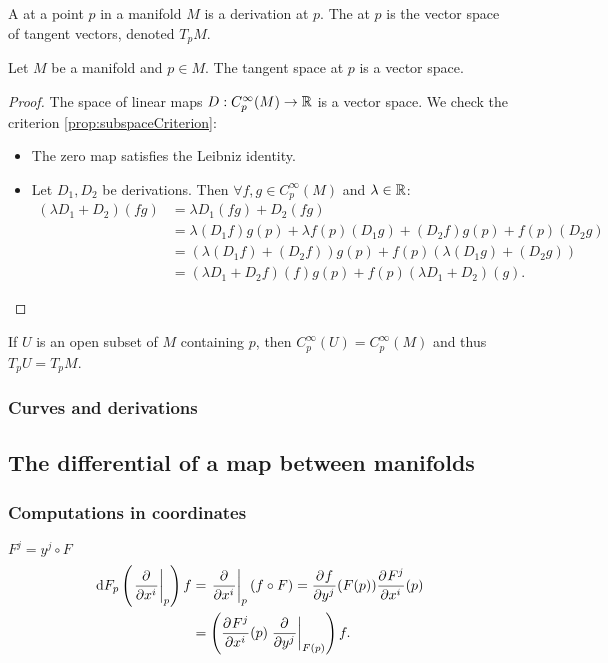 \begin{definition}
A  at a point $p$ in a manifold $M$ is a derivation at $p$. The  at $p$ is the vector space of tangent vectors, denoted $T_pM$.
\end{definition}
\begin{lemma}
Let $M$ be a manifold and $p\in M$. The tangent space at $p$ is a vector space.
\end{lemma}
\begin{proof}
The space of linear maps $D:C^\infty_p(M)\to \mathbb{R}$ is a vector space. We check the criterion \ref{prop:subspaceCriterion}:
\begin{itemize}
\item The zero map satisfies the Leibniz identity.
\item Let $D_1,D_2$ be derivations. Then $\forall f,g\in C^\infty_p(M)$ and $\lambda\in\mathbb{R}$:
\begin{align*}
(\lambda D_1 + D_2)(fg) &= \lambda D_1(fg) + D_2(fg) \\
&= \lambda (D_1f)g(p) + \lambda f(p)(D_1g) + (D_2f)g(p) + f(p)(D_2g) \\
&= (\lambda (D_1f) + (D_2f))g(p) + f(p)(\lambda(D_1g)+ (D_2g)) \\
&= (\lambda D_1 + D_2f)(f)g(p) + f(p)(\lambda D_1+ D_2)(g).
\end{align*}
\end{itemize}
\end{proof}

If $U$ is an open subset of $M$ containing $p$, then $C^\infty_p(U) = C^\infty_p(M)$ and thus $T_pU = T_pM$.

\subsubsection{Curves and derivations}

\subsection{The differential of a map between manifolds}

\subsubsection{Computations in coordinates}
$F^j = y^j\circ F$
\begin{align*}
\operatorname{d \!}{F}_p \left(\left. \frac{\partial{^{}}}{\partial{{x^i}^{}}} \right|_p\right)f &= \left. \frac{\partial{^{}}}{\partial{{x^i}^{}}} \right|_p(f\circ F) =  \frac{\partial{^{}}f}{\partial{{y^j}^{}}} (F(p)) \frac{\partial{^{}}F^j}{\partial{{x^i}^{}}} (p) \\
&= \left( \frac{\partial{^{}}F^j}{\partial{{x^i}^{}}} (p)\left. \frac{\partial{^{}}}{\partial{{y^j}^{}}} \right|_{F(p)}\right)f.
\end{align*}

